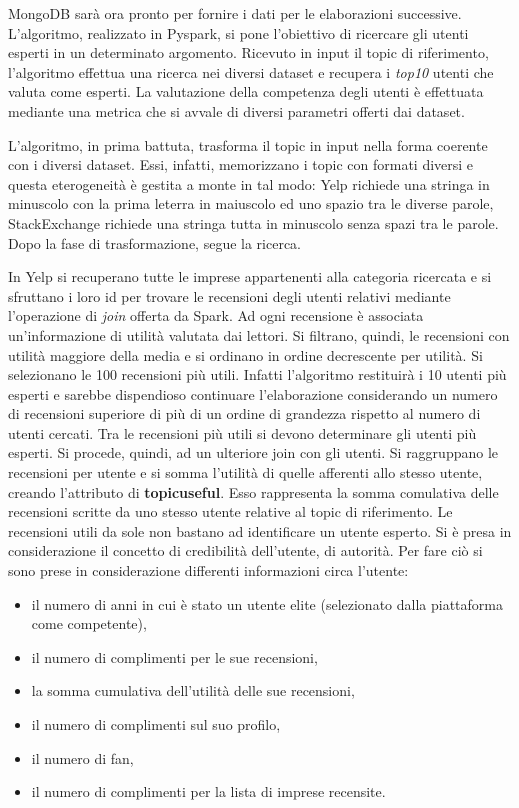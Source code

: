 MongoDB sarà ora pronto per fornire i dati per le elaborazioni successive. L'algoritmo, realizzato in Pyspark, si pone l'obiettivo di ricercare gli utenti esperti in un determinato argomento. Ricevuto in input il topic di riferimento, l'algoritmo effettua una ricerca nei diversi dataset e recupera i \emph{top10} utenti che valuta come esperti. La valutazione della competenza degli utenti è effettuata mediante una metrica che si avvale di diversi parametri offerti dai dataset.\par
L'algoritmo, in prima battuta, trasforma il topic in input nella forma coerente con i diversi dataset. Essi, infatti, memorizzano i topic con formati diversi e questa eterogeneità è gestita a monte in tal modo: Yelp richiede una stringa in minuscolo con la prima leterra in maiuscolo ed uno spazio tra le diverse parole, StackExchange richiede una stringa tutta in minuscolo senza spazi tra le parole. Dopo la fase di trasformazione, segue la ricerca.\par 
In Yelp si recuperano tutte le imprese appartenenti alla categoria ricercata e si sfruttano i loro id per trovare le recensioni degli utenti relativi mediante l'operazione di \emph{join} offerta da Spark. Ad ogni recensione è associata un'informazione di utilità valutata dai lettori. Si filtrano, quindi, le recensioni con utilità maggiore della media e si ordinano in ordine decrescente per utilità. Si selezionano le 100 recensioni più utili. Infatti l'algoritmo restituirà i 10 utenti più esperti e sarebbe dispendioso continuare l'elaborazione considerando un numero di recensioni superiore di più di un ordine di grandezza rispetto al numero di utenti cercati. Tra le recensioni più utili si devono determinare gli utenti più esperti. Si procede, quindi, ad un ulteriore join con gli utenti. Si raggruppano le recensioni per utente e si somma l'utilità di quelle afferenti allo stesso utente, creando l'attributo di \textbf{topicuseful}. Esso rappresenta la somma comulativa delle recensioni scritte da uno stesso utente relative al topic di riferimento. Le recensioni utili da sole non bastano ad identificare un utente esperto. Si è presa in considerazione il concetto di credibilità dell'utente, di autorità. Per fare ciò si sono prese in considerazione differenti informazioni circa l'utente:
\begin{itemize}
\item il numero di anni in cui è stato un utente elite (selezionato dalla piattaforma come competente),
\item il numero di complimenti per le sue recensioni,
\item la somma cumulativa dell'utilità delle sue recensioni,
\item il numero di complimenti sul suo profilo,
\item il numero di fan,
\item il numero di complimenti per la lista di imprese recensite.
\end{itemize}
